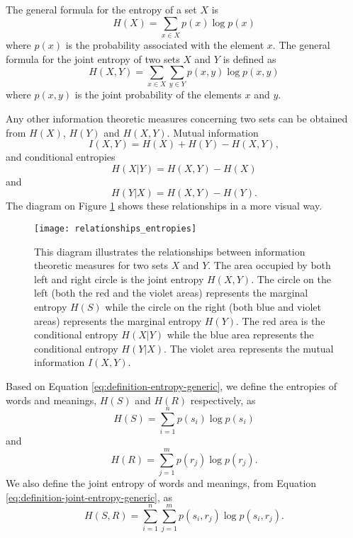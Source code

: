 The general formula for the entropy of a set $X$ is
\begin{equation}
  \label{eq:definition-entropy-generic}
  H(X) = \sum_{x \in X} p(x) \log p(x)
\end{equation}
where $p(x)$ is the probability associated with the element $x$.
The general formula for the joint entropy of two sets $X$ and $Y$ is defined as
\begin{equation}
  \label{eq:definition-joint-entropy-generic}
  H(X,Y) = \sum_{x \in X} \sum_{y \in Y} p(x,y) \log p(x,y)
\end{equation}
where $p(x,y)$ is the joint probability of the elements $x$ and $y$.

Any other information theoretic measures concerning two sets can be obtained from $H(X)$, $H(Y)$ and $H(X,Y)$.
Mutual information
\begin{equation*}
  I(X,Y) = H(X) + H(Y) - H(X,Y),
\end{equation*}
and conditional entropies
\begin{equation*}
  H(X|Y) = H(X,Y) - H(X)
\end{equation*}
and
\begin{equation*}
  H(Y|X) = H(X,Y) - H(Y).
\end{equation*}
The diagram on Figure \ref{fig:relationships-entropies} shows these relationships in a more visual way.

\begin{figure}
  \centering
  \texttt{[image: relationships\_entropies]}
  \caption{
    This diagram illustrates the relationships between information theoretic measures for two sets $X$ and $Y$.
    The area occupied by both left and right circle is the joint entropy $H(X,Y)$.
    The circle on the left (both the red and the violet areas) represents the marginal entropy $H(S)$ while the circle on the right (both blue and violet areas) represents the marginal entropy $H(Y)$.
    The red area is the conditional entropy $H(X|Y)$ while the blue area represents the conditional entropy $H(Y|X)$.
    The violet area represents the mutual information $I(X,Y)$.
  }
  \label{fig:relationships-entropies}
\end{figure}

Based on Equation \eqref{eq:definition-entropy-generic}, we define the entropies of words and meanings, $H(S)$ and $H(R)$ respectively, as
\begin{equation}
  \label{eq:definition-HS}
  H(S) = \sum_{i=1}^n p(s_i) \log p(s_i)
\end{equation}
and
\begin{equation}
  \label{eq:definition-HR}
  H(R) = \sum_{j=1}^m p(r_j) \log p(r_j).
\end{equation}
We also define the joint entropy of words and meanings, from Equation \eqref{eq:definition-joint-entropy-generic}, as
\begin{equation}
  \label{eq:definition-HSR}
  H(S,R) = \sum_{i=1}^n \sum_{j=1}^m p(s_i, r_j) \log p(s_i, r_j).
\end{equation}

